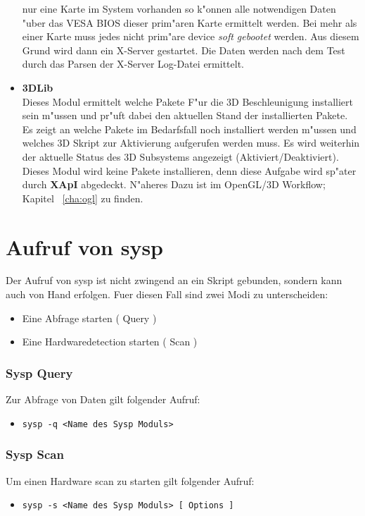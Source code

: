 \begin{itemize}
      nur eine Karte im System vorhanden so k"onnen alle notwendigen Daten 
      "uber das VESA BIOS dieser prim"aren Karte ermittelt werden. Bei mehr als
      einer Karte muss jedes nicht prim"are device \textit{soft gebootet}
      werden. Aus diesem Grund wird dann ein X-Server gestartet. Die
      Daten werden nach dem Test durch das Parsen der X-Server Log-Datei
      ermittelt.
\item \textbf{3DLib}\\
      Dieses Modul ermittelt welche Pakete F"ur die 3D Beschleunigung
      installiert sein m"ussen und pr"uft dabei den aktuellen Stand der
      installierten Pakete. Es zeigt an welche Pakete im Bedarfsfall 
      noch installiert werden m"ussen und welches 3D Skript zur Aktivierung
      aufgerufen werden muss. Es wird weiterhin der aktuelle Status des 3D 
      Subsystems angezeigt (Aktiviert/Deaktiviert). Dieses Modul wird 
      keine Pakete installieren, denn diese Aufgabe wird sp"ater durch 
      \textbf{XApI} abgedeckt. N"aheres Dazu ist im OpenGL/3D Workflow;
      Kapitel ~\ref{cha:ogl} zu finden.
\end{itemize}

\section{Aufruf von sysp}
Der Aufruf von sysp ist nicht zwingend an ein Skript gebunden, sondern 
kann auch von Hand erfolgen. Fuer diesen Fall sind zwei Modi zu unterscheiden:
\begin{itemize}
\item Eine Abfrage starten ( Query )
\item Eine Hardwaredetection starten ( Scan )
\end{itemize}
\subsubsection{Sysp Query}
Zur Abfrage von Daten gilt folgender Aufruf:
\begin{itemize}
\item \verb+sysp -q <Name des Sysp Moduls>+
\end{itemize}

\subsubsection{Sysp Scan}
Um einen Hardware scan zu starten gilt folgender Aufruf:
\begin{itemize}
\item \verb+sysp -s <Name des Sysp Moduls> [ Options ]+ 
\end{itemize}
